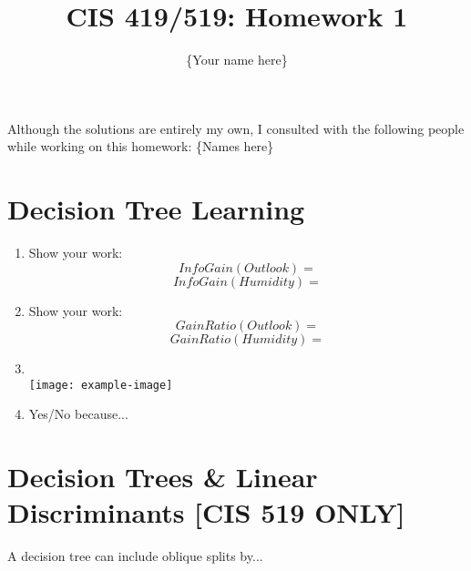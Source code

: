 \documentclass{article}
\title{CIS 419/519: Homework 1}
\author{\{Your name here\}}
\date{}
\begin{document}
    \maketitle
    Although the solutions are entirely my own, I consulted with the following people while working on this homework: \{Names here\}
    
    \section{Decision Tree Learning}
        \begin{enumerate}
            \item %
            Show your work:
            \begin{equation*}
                \mathit{InfoGain}(\mathit{Outlook}) =
            \end{equation*}
            \begin{equation*}
                \mathit{InfoGain}(\mathit{Humidity}) =
            \end{equation*}
            
            \item %
            Show your work:
            \begin{equation*}
                \mathit{GainRatio}(\mathit{Outlook}) =
            \end{equation*}
            \begin{equation*}
                \mathit{GainRatio}(\mathit{Humidity}) =
            \end{equation*}
            
            \item %
            ~\\
            
            \texttt{[image: example-image]}
                        
            \item %
            Yes/No because...
        \end{enumerate}
        
       \section{Decision Trees \& Linear Discriminants [CIS 519 ONLY]}
        
        A decision tree can include oblique splits by...
        
\end{document}
